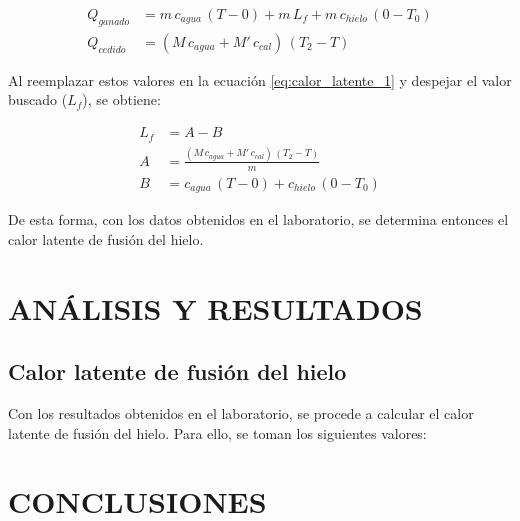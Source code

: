 \documentclass[10pt]{article}
\begin{document}
\begin{multicols*}{2}
\begin{itemize}
            \begin{equation}
                \begin{split}
                    Q_{ganado} &= m \, c_{agua} \, (T - 0) + m \, L_f + m \, c_{hielo} \, (0 - T_0)\\
                    Q_{cedido} &= (M \, c_{agua} + M' \, c_{cal}) \, (T_2 - T)
                \end{split}
                \label{eq:calor_latente_2}
            \end{equation}

            Al reemplazar estos valores en la ecuación \ref{eq:calor_latente_1} y despejar el valor buscado ($L_f$), se obtiene:

            \begin{equation}
                \begin{split}
                    L_f &= A - B \\
                    A &= \frac{(M \, c_{agua} + M' \, c_{cal}) \, (T_2 - T)}{m} \\
                    B &= c_{agua} \, (T - 0) + c_{hielo} \, (0 - T_0)
                \end{split}
                \label{eq:calor_latente_3}
            \end{equation}

            De esta forma, con los datos obtenidos en el laboratorio, se determina entonces el calor latente de fusión del hielo.
    \end{itemize}




    \section{\small ANÁLISIS Y RESULTADOS}
        \subsection*{\small Calor latente de fusión del hielo}
        Con los resultados obtenidos en el laboratorio, se procede a calcular el calor latente de fusión del hielo. Para ello, se toman los siguientes valores:

    \section{\small CONCLUSIONES}






    \nocite{giancoli}
    \nocite{montiel2015física}

    
    
\end{multicols*}
\end{document}
